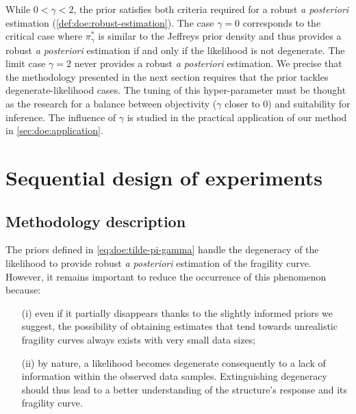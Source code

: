 

While $0<\gamma<2$, the prior satisfies both criteria required for a robust \emph{a posteriori} estimation (\cref{def:doe:robust-estimation}). The case $\gamma=0$ corresponds to the critical case where $\pi^\ast_\gamma$ is similar to the Jeffreys prior density and thus provides a robust \emph{a posteriori} estimation if and only if the likelihood is not degenerate. The limit case $\gamma=2$ never provides a robust \emph{a posteriori} estimation. We precise that the methodology presented in the next section requires that the prior tackles degenerate-likelihood cases. The tuning of this hyper-parameter must be thought as the research for a balance between objectivity ($\gamma$ closer to $0$) and suitability for inference. The influence of $\gamma$ is studied in the practical application of our method in \cref{sec:doe:application}.











\section{Sequential design of experiments%
}\label{sec:doe:PEmethod}

\subsection{Methodology description}



The priors defined in \cref{eq:doe:tilde-pi-gamma} handle the degeneracy of the likelihood to provide robust \emph{a posteriori} estimation of the fragility curve. However, it remains important to reduce the occurrence of this phenomenon because: %
    \begin{enumerate}
        \item[(i)]  even if it partially disappears thanks to the slightly informed priors we suggest, { the possibility of obtaining estimates that tend towards unrealistic fragility curves always exists with very small data sizes;}
        \item[(ii)] by nature, a likelihood becomes degenerate consequently to a lack of information within the observed data samples. Extinguishing degeneracy should thus lead to a better understanding of the structure's response and its fragility curve.
    \end{enumerate}

